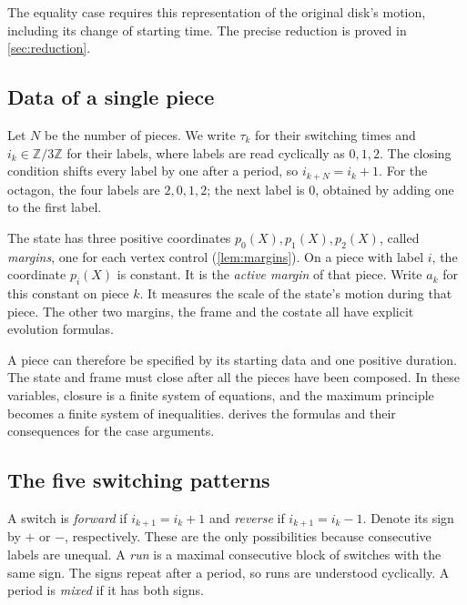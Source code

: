 The equality case requires this representation of the original disk's motion, including its change
of starting time. The precise reduction is proved in \cref{sec:reduction}.

\subsection{Data of a single piece}\label{sec:outline-pieces}

Let $N$ be the number of pieces. We write $\tau_k$ for their switching times and
$i_k\in\mathbb Z/3\mathbb Z$ for their labels, where labels are read cyclically as $0,1,2$.
The closing condition shifts every label by one after a period, so $i_{k+N}=i_k+1$.
For the octagon, the four labels are $2,0,1,2$; the next label is $0$, obtained by adding one to
the first label.

The state has three positive coordinates $p_0(X),p_1(X),p_2(X)$, called \emph{margins}, one for
each vertex control (\cref{lem:margins}). On a piece with label $i$, the coordinate $p_i(X)$ is
constant. It is the \emph{active margin} of that piece. Write $a_k$ for this constant on piece
$k$. It measures the scale of the state's motion during that piece. The other two margins, the
frame and the costate all have explicit evolution formulas.

A piece can therefore be specified by its starting data and one positive duration. The state and
frame must close after all the pieces have been composed. In these variables, closure is a finite
system of equations, and the maximum principle becomes a finite system of inequalities.
 derives the formulas and their consequences for the case arguments.

\subsection{The five switching patterns}\label{sec:outline-signs}

A switch is \emph{forward} if $i_{k+1}=i_k+1$ and \emph{reverse} if
$i_{k+1}=i_k-1$. Denote its sign by $+$ or $-$, respectively. These are the only possibilities
because consecutive labels are unequal. A \emph{run} is a maximal consecutive block of switches
with the same sign. The signs repeat after a period, so runs are understood cyclically. A period
is \emph{mixed} if it has both signs.

